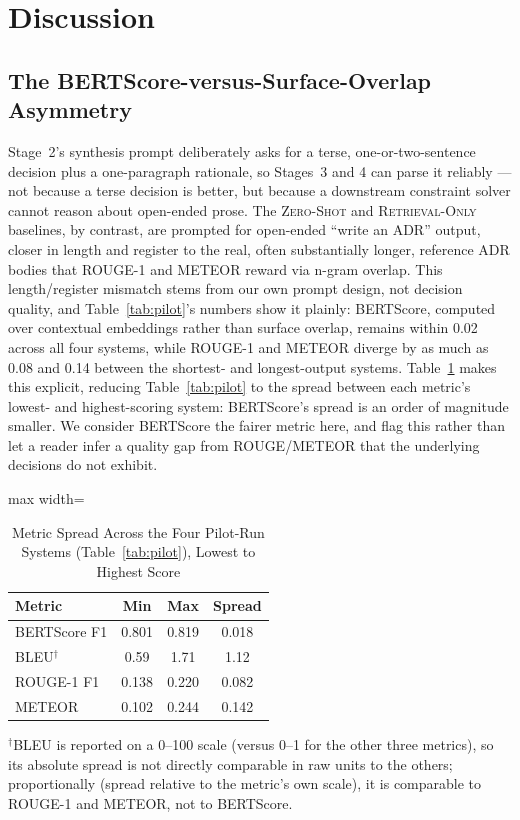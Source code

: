 \documentclass[preprint,12pt,authoryear]{elsarticle}
\newcommand{\sysZS}{\textsc{Zero-Shot}}
\newcommand{\sysRO}{\textsc{Retrieval-Only}}
\renewcommand{\_}{\textunderscore\allowbreak{}}
\begin{document}
\section{Discussion}
\label{sec:discussion}

\subsection{The BERTScore-versus-Surface-Overlap Asymmetry}

Stage~2's synthesis prompt deliberately asks for a terse, one-or-two-sentence decision plus a one-paragraph rationale, so Stages~3 and 4 can parse it reliably --- not because a terse decision is better, but because a downstream constraint solver cannot reason about open-ended prose. The \sysZS{} and \sysRO{} baselines, by contrast, are prompted for open-ended ``write an ADR'' output, closer in length and register to the real, often substantially longer, reference ADR bodies that ROUGE-1 and METEOR reward via n-gram overlap. This length/register mismatch stems from our own prompt design, not decision quality, and Table~\ref{tab:pilot}'s numbers show it plainly: BERTScore, computed over contextual embeddings rather than surface overlap, remains within 0.02 across all four systems, while ROUGE-1 and METEOR diverge by as much as 0.08 and 0.14 between the shortest- and longest-output systems. Table~\ref{tab:metric-range} makes this explicit, reducing Table~\ref{tab:pilot} to the spread between each metric's lowest- and highest-scoring system: BERTScore's spread is an order of magnitude smaller. We consider BERTScore the fairer metric here, and flag this rather than let a reader infer a quality gap from ROUGE/METEOR that the underlying decisions do not exhibit.

\begin{table}[!htbp]
\caption{Metric Spread Across the Four Pilot-Run Systems (Table~\ref{tab:pilot}), Lowest to Highest Score\label{tab:metric-range}}
\centering
\begin{adjustbox}{max width=\textwidth}
\begin{tabular}{@{}lccc@{}}
\toprule
Metric & Min & Max & Spread \\
\midrule
BERTScore F1 & 0.801 & 0.819 & 0.018 \\
BLEU$^\dagger$ & 0.59 & 1.71 & 1.12 \\
ROUGE-1 F1   & 0.138 & 0.220 & 0.082 \\
METEOR       & 0.102 & 0.244 & 0.142 \\
\bottomrule
\end{tabular}
\end{adjustbox}

\vspace{2pt}
\footnotesize $^\dagger$BLEU is reported on a 0--100 scale (versus 0--1 for the other three metrics), so its absolute spread is not directly comparable in raw units to the others; proportionally (spread relative to the metric's own scale), it is comparable to ROUGE-1 and METEOR, not to BERTScore.
\end{table}
\FloatBarrier
\end{document}
